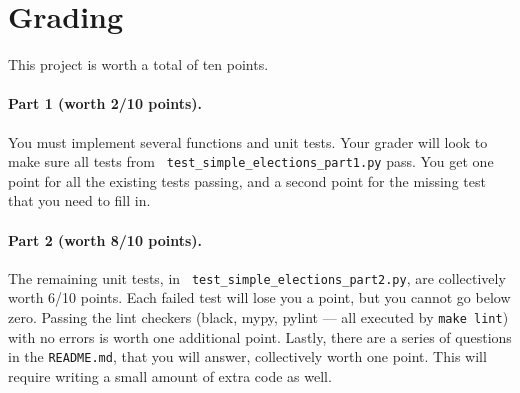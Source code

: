 \documentclass[letterpaper,12pt]{article}
\begin{document}
\section{Grading}

This project is worth a total of ten points.

\paragraph{Part 1 (worth 2/10 points).} You must implement several functions and unit
tests. Your grader will look to make sure all tests from {\tt
  test\_simple\_elections\_part1.py} pass. You get one point for all
the existing tests passing, and a second point for the missing test
that you need to fill in.

\paragraph{Part 2 (worth 8/10 points).} The remaining unit tests, in {\tt
  test\_simple\_elections\_part2.py}, are collectively worth
6/10 points. Each failed test will lose you a point, but
you cannot go below zero. Passing the lint checkers
(black, mypy, pylint --- all executed by {\tt make lint}) with no
errors is worth one additional point.
Lastly, there are a series of questions in the {\tt README.md},
that you will answer, collectively worth one point. This will require
writing a small amount of extra code as well.
\end{document}
